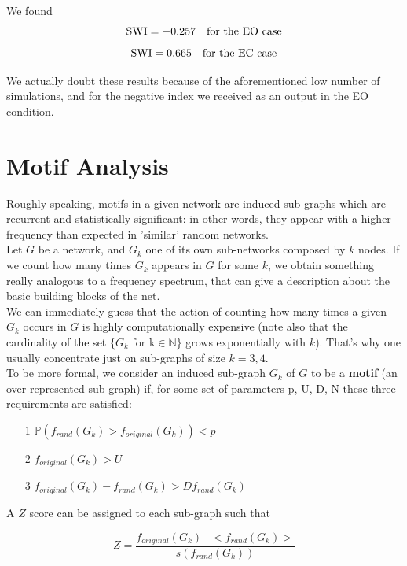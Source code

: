 \documentclass[%
 aip,
 jmp,%
 amsmath,amssymb,
 reprint,%
]{revtex4-1}
\begin{document}
We found
\[ \text{SWI} =  -0.257 \text{\quad for the EO case}\]
\[ \text{SWI} =  0.665 \text{\quad for the EC case}\]

We actually doubt these results because of the aforementioned low number of simulations, and for the negative index we received as an output in the EO condition.

\section{\label{sec:level1}Motif Analysis}

Roughly speaking, motifs in a given network are induced sub-graphs which are recurrent and statistically significant: in other words, they appear with a higher frequency than expected in 'similar' random networks.\\

Let $G$ be a network, and $G_k$ one of its own sub-networks composed by $k$ nodes. If we count how many times $G_k$ appears in $G$ for some $k$, we obtain something really analogous to a frequency spectrum, that can give a description about the basic building blocks of the net.\\

We can immediately guess that the action of counting how many times a given $G_k$ occurs in $G$ is highly computationally expensive (note also that the cardinality of the set $\{ G_k \text{ for k} \in \mathbb{N\} }$ grows exponentially with $k$). That's why one usually concentrate just on sub-graphs of size $k = 3, 4$.\\

To be more formal, we consider an induced sub-graph $G_k$ of $G$ to be a \textbf{motif} (an over represented sub-graph) if, for some set of parameters {p, U, D, N} these three requirements are satisfied:

\begin{itemize}
	\item[1] $\mathbb{P}(f_{rand}(G_k) > f_{original}(G_k)) < p$
	\item[2] $f_{original}(G_k) > U$
	\item[3] $f_{original}(G_k)- f_{rand}(G_k)>D f_{rand}(G_k)$
\end{itemize}

A $Z$ score can be assigned to each sub-graph such that

\begin{equation}
	Z = \frac{f_{original}(G_k) - <f_{rand}(G_k)>}{s(f_{rand}(G_k))}
\end{equation}
\end{document}
